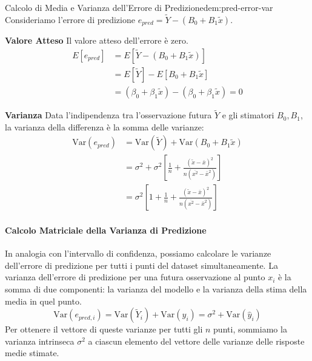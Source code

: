 \begin{dimostrazione}{Calcolo di Media e Varianza dell'Errore di Predizione}{dem:pred-error-var}
Consideriamo l'errore di predizione \( e_{pred} = \tilde{Y} - (B_0 + B_1\tilde{x}) \).

\textbf{Valore Atteso}
Il valore atteso dell'errore è zero.
\begin{align*}
    E[e_{pred}] &= E[\tilde{Y} - (B_0 + B_1\tilde{x})] \\
    &= E[\tilde{Y}] - E[B_0 + B_1\tilde{x}] \\
    &= (\beta_0 + \beta_1\tilde{x}) - (\beta_0 + \beta_1\tilde{x}) = 0
\end{align*}

\textbf{Varianza}
Data l'indipendenza tra l'osservazione futura \(\tilde{Y}\) e gli stimatori \(B_0, B_1\), la varianza della differenza è la somma delle varianze:
\begin{align*}
    \text{Var}(e_{pred}) &= \text{Var}(\tilde{Y}) + \text{Var}(B_0 + B_1\tilde{x}) \\
    &= \sigma^2 + \sigma^2 \left[ \frac{1}{n} + \frac{(\tilde{x} - \bar{x})^2}{n(\overline{x^2}-\bar{x}^2)} \right] \\
    &= \sigma^2 \left[ 1 + \frac{1}{n} + \frac{(\tilde{x} - \bar{x})^2}{n(\overline{x^2}-\bar{x}^2)} \right]
\end{align*}
\end{dimostrazione}

\paragraph{Calcolo Matriciale della Varianza di Predizione}
In analogia con l'intervallo di confidenza, possiamo calcolare le varianze dell'errore di predizione per tutti i punti del dataset simultaneamente. La varianza dell'errore di predizione per una futura osservazione al punto \(x_i\) è la somma di due componenti: la varianza del modello e la varianza della stima della media in quel punto.
\[
    \text{Var}(e_{pred, i}) = \text{Var}(\tilde{Y}_i) + \text{Var}(\hat{y}_i) = \sigma^2 + \text{Var}(\hat{y}_i)
\]
Per ottenere il vettore di queste varianze per tutti gli \(n\) punti, sommiamo la varianza intrinseca \(\sigma^2\) a ciascun elemento del vettore delle varianze delle risposte medie stimate.

